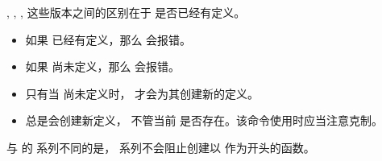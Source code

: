 \documentclass{l3doc}
\begin{document}
%
, , ,  
这些版本之间的区别在于  是否已经有定义。
\begin{itemize}
    \item 如果  已经有定义，那么  会报错。
    \item 如果  尚未定义，那么  会报错。
    \item 只有当   尚未定义时， 才会为其创建新的定义。
    \item {} 总是会创建新定义，
    不管当前  是否存在。该命令使用时应当注意克制。
\end{itemize}

%
\begin{texnote}
    与 \LaTeXe{} 的  系列不同的是，
     系列不会阻止创建以  作为开头的函数。
\end{texnote}
\end{document}
